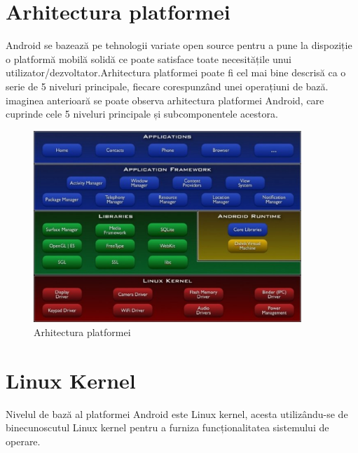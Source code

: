 \section{Arhitectura platformei}
Android se bazează pe tehnologii variate open source pentru a pune la dispoziție o platformă mobilă solidă ce poate satisface toate necesitățile unui utilizator/dezvoltator.\newline Arhitectura platformei poate fi cel mai bine descrisă ca o serie de 5 niveluri principale, fiecare corespunzând unei operațiuni de bază.  imaginea anterioară se poate observa arhitectura platformei Android, care cuprinde cele 5 niveluri principale și subcomponentele acestora.\cite{1}
\begin{figure}
\caption{Arhitectura platformei}
\begin{center}
\includegraphics[width=0.9\textwidth]
{imagini/arhitectura-sistem.eps}
\end{center}
\end{figure}

\section{Linux Kernel}
\vspace{1cm}
Nivelul de bază al platformei Android este Linux kernel, acesta utilizându-se de binecunoscutul Linux kernel pentru a furniza funcționalitatea sistemului de operare.\newline


